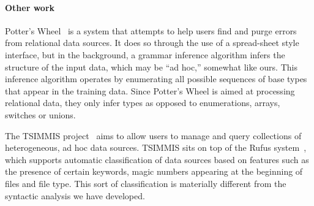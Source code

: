 \paragraph*{Other work}
Potter's Wheel~\cite{raman+:potterwheel} is a system that attempts to
help users find and purge errors from
relational data sources.  It does so through the use of a spread-sheet
style interface, but in the background, a grammar inference algorithm
infers the structure of the input data, which may be ``ad hoc,'' 
somewhat like ours.  This inference algorithm operates by
enumerating all possible sequences of base types that appear
in the training data.  
Since Potter's Wheel is aimed at processing
relational data, they only infer  types
as opposed to enumerations, arrays, switches or unions.  

The TSIMMIS project~\cite{chawathe+:tsimmis} aims to
allow users to manage and query collections of heterogeneous, ad hoc
data sources.  TSIMMIS sits on top of the Rufus
system~\cite{shoens+:rufus}, which supports automatic classification
of data sources based on features such as the presence of certain
keywords, magic numbers appearing at the beginning of files and file
type.  
This sort of classification is materially
different from the syntactic analysis we have developed.
